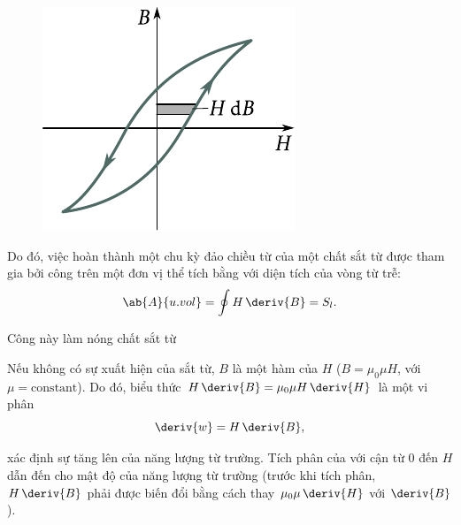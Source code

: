 \begin{figure}[!h]
	\begin{center}
		\includegraphics[scale=1]{figures/ch_08/fig_8_12.pdf}
		\caption[]{}
		\label{fig:8_12}
	\end{center}
	\vspace{-0.8cm}
\end{figure}

Do đó, việc hoàn thành một chu kỳ đảo chiều từ của một chất sắt từ được tham gia bởi công trên một đơn vị thể tích bằng với diện tích của vòng từ trễ:
\begin{equation}\label{eq:8_47}
	\ab{A}{u.vol} = \oint H\, \deriv{B} = S_l.
\end{equation}

\noindent
Công này làm nóng chất sắt từ

Nếu không có sự xuất hiện của sắt từ, $B$ là một hàm của $H$ ($B=\mu_0\mu H$, với $\mu=\text{constant}$).
Do đó, biểu thức $H\,\deriv{B}=\mu_0\mu H\, \deriv{H}$ là một vi phân
\begin{equation}\label{eq:8_48}
	\deriv{w} = H\,\deriv{B},
\end{equation}

\noindent
xác định sự tăng lên của năng lượng từ trường.
Tích phân của với cận từ $0$ đến $H$ dẫn đến  cho mật độ của năng lượng từ trường (trước khi tích phân, $H\,\deriv{B}$ phải được biến đổi bằng cách thay $\mu_0\mu\,\deriv{H}$ với $\deriv{B}$).
